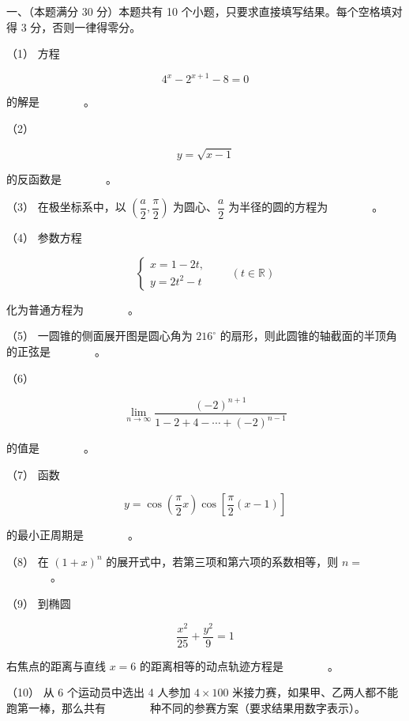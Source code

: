 \begin{question}

一、（本题满分 30 分）本题共有 10 个小题，只要求直接填写结果。每个空格填对得 3 分，否则一律得零分。

（1） 方程

\nopagebreak[4]
\[
4^x-2^{x+1}-8=0
\]

的解是　　　　。

（2）　

\nopagebreak[4]
\[
y=\sqrt{x-1}
\]

的反函数是　　　　。

（3） 在极坐标系中，以 $\left(\dfrac a2,\dfrac\pi2\right)$ 为圆心、$\dfrac a2$ 为半径的圆的方程为　　　　。

（4） 参数方程

\nopagebreak[4]
\[
\begin{cases}
x=1-2t,\\
y=2t^2-t
\end{cases}
\qquad(t\in\mathbb R)
\]

化为普通方程为　　　　。

（5） 一圆锥的侧面展开图是圆心角为 $216^\circ$ 的扇形，则此圆锥的轴截面的半顶角的正弦是　　　　。

（6）　

\nopagebreak[4]
\[
\lim_{n\to\infty}
\frac{(-2)^{n+1}}{1-2+4-\cdots+(-2)^{n-1}}
\]

的值是　　　　。

（7） 函数

\nopagebreak[4]
\[
y=\cos\left(\frac\pi2x\right)\cos\left[\frac\pi2(x-1)\right]
\]

的最小正周期是　　　　。

（8） 在 $(1+x)^n$ 的展开式中，若第三项和第六项的系数相等，则 $n=$　　　　。

（9） 到椭圆

\nopagebreak[4]
\[
\frac{x^2}{25}+\frac{y^2}{9}=1
\]

右焦点的距离与直线 $x=6$ 的距离相等的动点轨迹方程是　　　　。

（10） 从 6 个运动员中选出 4 人参加 $4\times100$ 米接力赛，如果甲、乙两人都不能跑第一棒，那么共有　　　　种不同的参赛方案（要求结果用数字表示）。

\Needspace{0.4\textheight}
\end{question}
